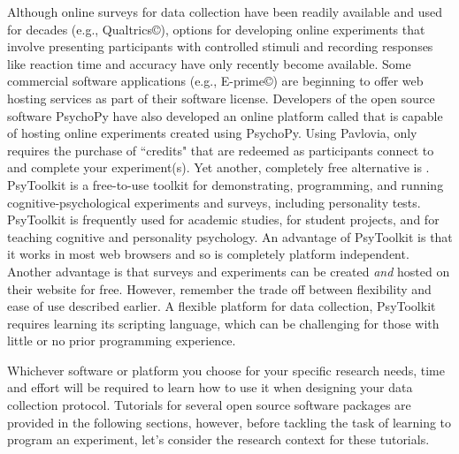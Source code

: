 Although online surveys for data collection have been readily available and used for decades (e.g., Qualtrics\copyright), options for developing online experiments that involve presenting participants with controlled stimuli and recording responses like reaction time and accuracy have only recently become available. Some commercial software applications (e.g., E-prime\copyright) are beginning to offer web hosting services as part of their software license. Developers of the open source software PsychoPy have also developed an online platform called  that is capable of hosting online experiments created using PsychoPy. Using Pavlovia, only requires the purchase of ``credits" that are redeemed as participants connect to and complete your experiment(s).  Yet another, completely free alternative is  \citep{stoet2010psytoolkit,stoet2017psytoolkit}. PsyToolkit is a free-to-use toolkit for demonstrating, programming, and running cognitive-psychological experiments and surveys, including personality tests. PsyToolkit is frequently used for academic studies, for student projects, and for teaching cognitive and personality psychology. An advantage of PsyToolkit is that it works in most web browsers and so is completely \gls{platform independent}.  Another advantage is that surveys and experiments can be created \emph{and} hosted on their website for free.  However, remember the trade off between flexibility and ease of use described earlier.  A flexible platform for data collection, PsyToolkit requires learning its scripting language, which can be challenging for those with little or no prior programming experience.

Whichever software or platform you choose for your specific research needs, time and effort will be required to learn how to use it when designing your data collection protocol.  Tutorials for several open source software packages are provided in the following sections, however, before tackling the task of learning to program an experiment, let's consider the research context for these tutorials.


